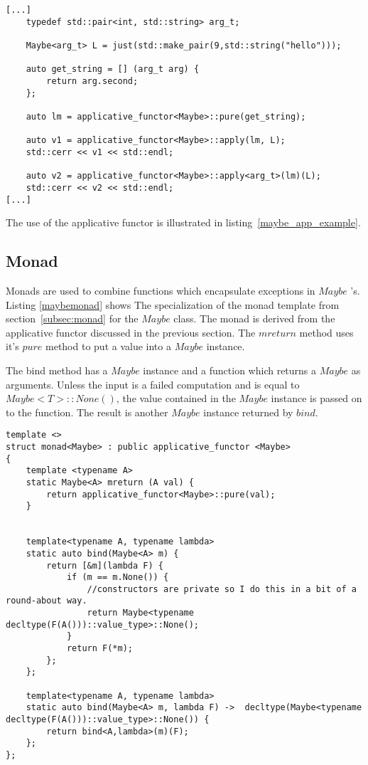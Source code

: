 \documentclass[12pt,fleqn]{article}
\begin{document}
%
%
\begin{minipage}{\linewidth}
\begin{lstlisting}[caption=example of the maybe applicative, label=maybe_app_example]
[...]
	typedef std::pair<int, std::string> arg_t;

	Maybe<arg_t> L = just(std::make_pair(9,std::string("hello")));

	auto get_string = [] (arg_t arg) {
		return arg.second;
	};

	auto lm = applicative_functor<Maybe>::pure(get_string);

	auto v1 = applicative_functor<Maybe>::apply(lm, L);
	std::cerr << v1 << std::endl;

	auto v2 = applicative_functor<Maybe>::apply<arg_t>(lm)(L);
	std::cerr << v2 << std::endl;
[...]
\end{lstlisting}
\end{minipage}
%
%
%

The use of the applicative functor is illustrated in listing~\ref{maybe_app_example}.



%
\subsection{Monad}
%

Monads are used to combine functions which encapsulate exceptions in $Maybe$ 's.
Listing \ref{maybemonad} shows The specialization of the monad template from section~\ref{subsec:monad} for the $Maybe$ class. 
The monad is derived from the applicative functor discussed in the previous section.
The $mreturn$ method uses it's $pure$ method to put a value into a $Maybe$ instance.

The bind method has a $Maybe$ instance and a function which returns a $Maybe$ as arguments.
Unless the input is a failed computation and  is equal to $Maybe<T>::None()$, the value contained in the $Maybe$ instance is passed on to the function.
The result is another $Maybe$ instance returned by $bind$.


%
%
\begin{minipage}{\linewidth}
\begin{lstlisting}[caption=Maybe monad, label=maybemonad]
template <> 
struct monad<Maybe> : public applicative_functor <Maybe>
{
	template <typename A> 
	static Maybe<A> mreturn (A val) {
		return applicative_functor<Maybe>::pure(val);
	}


	template<typename A, typename lambda>
	static auto bind(Maybe<A> m) {
		return [&m](lambda F) {
			if (m == m.None()) {
				//constructors are private so I do this in a bit of a round-about way.
				return Maybe<typename decltype(F(A()))::value_type>::None();
			}
			return F(*m);		
		};
	};

	template<typename A, typename lambda>
	static auto bind(Maybe<A> m, lambda F) ->  decltype(Maybe<typename decltype(F(A()))::value_type>::None()) {
		return bind<A,lambda>(m)(F);
	};
};

\end{lstlisting}
\end{minipage}
%
%
%
\end{document}
